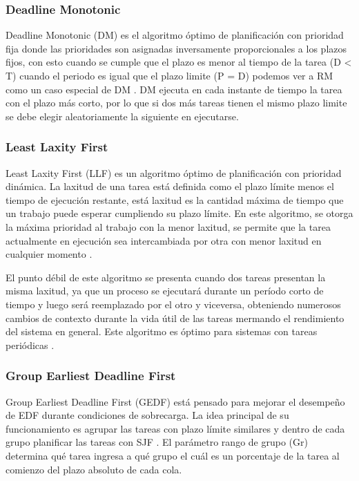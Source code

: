 \subsubsection{Deadline Monotonic}
Deadline Monotonic (DM) es el algoritmo óptimo de planificación con prioridad fija donde las prioridades son asignadas inversamente proporcionales a los plazos fijos, con esto cuando se cumple que el plazo es menor al tiempo de la tarea (D < T) cuando el periodo es igual que el plazo limite (P = D) podemos ver a RM como un caso especial de DM \cite{NPr}. DM ejecuta en cada instante de tiempo la tarea con el plazo más corto, por lo que si dos más tareas tienen el mismo plazo limite se debe elegir aleatoriamente la siguiente en ejecutarse.

\subsubsection{Least Laxity First}
Least Laxity First (LLF) es un algoritmo óptimo de planificación con prioridad dinámica. La laxitud de una tarea está definida como el plazo límite menos el tiempo de ejecución restante, está laxitud es la cantidad máxima de tiempo que un trabajo puede esperar cumpliendo su plazo límite. En este algoritmo, se otorga la máxima prioridad al trabajo con la menor laxitud, se permite que la tarea actualmente en ejecución sea intercambiada por otra con menor laxitud en cualquier momento \cite{NPr}.
  \vspace{0.3cm}
  
  El punto débil de este algoritmo se presenta cuando dos tareas presentan la misma laxitud, ya que un proceso se ejecutará durante un período corto de tiempo y luego será reemplazado por el otro y viceversa, obteniendo numerosos cambios de contexto durante la vida útil de las tareas mermando el rendimiento del sistema en general. Este algoritmo es óptimo para sistemas con tareas periódicas \cite{ComRTT}.

\subsubsection{Group Earliest Deadline First}
Group Earliest Deadline First (GEDF) está pensado para mejorar el desempeño de EDF durante condiciones de sobrecarga. La idea principal de su funcionamiento es agrupar las tareas con plazo límite similares y dentro de cada grupo planificar las tareas con SJF \cite{ComRTT}. El parámetro rango de grupo (Gr) determina qué tarea ingresa a qué grupo el cuál es un porcentaje de la tarea al comienzo del plazo absoluto de cada cola.

